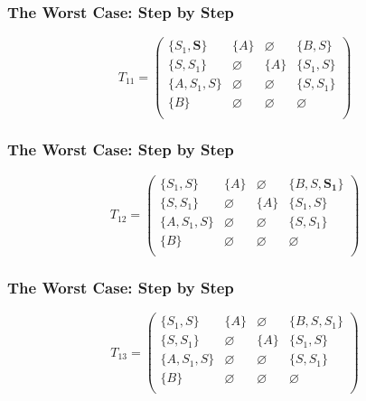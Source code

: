 \documentclass[xcolor=table]{beamer}
\begin{document}
\begin{frame}[noframenumbering]
  \transwipe[direction=90]
  \frametitle{The Worst Case: Step by Step}

\begin{figure}[h]
\[
T_{11} = \begin{pmatrix}
\{S_1, \pmb{S}\}     & \{A\}       & \varnothing & \{B, S\}    \\
\{S, S_1\}       & \varnothing & \{A\}       & \{S_1, S\}     \\
\{A, S_1, S\}  & \varnothing & \varnothing & \{S, S_1\} \\
\{B\}       & \varnothing & \varnothing & \varnothing \\
\end{pmatrix}
\]
\label{ExampleQueryFirstIteration}
\end{figure}
\end{frame} 

\begin{frame}[noframenumbering]
  \transwipe[direction=90]
  \frametitle{The Worst Case: Step by Step}

\begin{figure}[h]
\[
T_{12} = \begin{pmatrix}
\{S_1, S\}     & \{A\}       & \varnothing & \{B, S, \pmb{S_1}\}    \\
\{S, S_1\}       & \varnothing & \{A\}       & \{S_1, S\}     \\
\{A, S_1, S\}  & \varnothing & \varnothing & \{S, S_1\} \\
\{B\}       & \varnothing & \varnothing & \varnothing \\
\end{pmatrix}
\]
\label{ExampleQueryFirstIteration}
\end{figure}
\end{frame} 

\begin{frame}[noframenumbering]
  \transwipe[direction=90]
  \frametitle{The Worst Case: Step by Step}

\begin{figure}[h]
\[
T_{13} = \begin{pmatrix}
\{S_1, S\}     & \{A\}       & \varnothing & \{B, S, S_1\}    \\
\{S, S_1\}       & \varnothing & \{A\}       & \{S_1, S\}     \\
\{A, S_1, S\}  & \varnothing & \varnothing & \{S, S_1\} \\
\{B\}       & \varnothing & \varnothing & \varnothing \\
\end{pmatrix}
\]
\label{ExampleQueryFirstIteration}
\end{figure}
\end{frame}        
            
\end{document}
